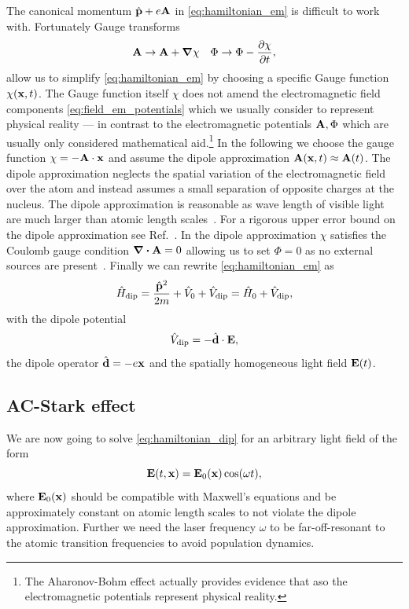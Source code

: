 The canonical momentum $\hat{\vb{p}}+e\vb{A}$ in \cref{eq:hamiltonian_em} is
difficult to work with. Fortunately Gauge transforms
\begin{align}
  \vb{A}\to\vb{A}+\grad{\chi}
  &&
  \Phi\to\Phi-\pdv{\chi}{t}
  \label{eq:gauge_transform_em},
\end{align}
allow us to simplify \cref{eq:hamiltonian_em} by choosing a specific Gauge
function $\chi(\vb{x},t)$. The Gauge function itself $\chi$ does not amend the
electromagnetic field components \cref{eq:field_em_potentials} which we
usually consider to represent physical reality --- in contrast to the
electromagnetic potentials $\vb{A},\Phi$ which are usually only considered
mathematical aid.\footnote{The Aharonov-Bohm effect actually provides evidence
that aso the electromagnetic potentials represent physical reality.} In the
following we choose the gauge function $\chi=-\vb{A}\cdot\vb{x}$ and assume
the dipole approximation $\vb{A}(\vb{x},t)\approx\vb{A}(t)$. The dipole
approximation neglects the spatial variation of the electromagnetic field
over the atom and instead assumes a small separation of opposite charges at
the nucleus. The dipole approximation is reasonable as wave length of visible
light are much larger than atomic length scales~\cite{Gerry2004}. For a
rigorous upper error bound on the dipole approximation see
Ref.~\cite{Bossmann2016}. In the dipole approximation $\chi$ satisfies the
Coulomb gauge condition $\divergence{\vb{A}}=0$ allowing us to set $\Phi=0$
as no external sources are present~\cite{Jackson2005}. Finally we can rewrite
\cref{eq:hamiltonian_em} as
\begin{equation}
  \hat{H}_\text{dip}
  =\frac{\hat{\vb{p}}^2}{2m}+\hat{V}_0+\hat{V}_\text{dip}
  =\hat{H}_0+\hat{V}_\text{dip}
  \label{eq:hamiltonian_dip},
\end{equation}
with the dipole potential
\begin{equation}
  \hat{V}_\text{dip}
  =-\hat{\vb{d}}\cdot\vb{E}
  \label{eq:potential_dip},
\end{equation}
the dipole operator $\hat{\vb{d}}=-e\vb{x}$ and the spatially homogeneous
light field $\vb{E}(t)$.

\subsection{AC-Stark effect}

We are now going to solve \cref{eq:hamiltonian_dip} for an arbitrary light
field of the form
\begin{equation}
  \vb{E}(t,\vb{x})
  =\vb{E}_0(\vb{x})\cos(\omega t)
  \label{eq:light_field},
\end{equation}
where $\vb{E}_0(\vb{x})$ should be compatible with Maxwell's equations and
be approximately constant on atomic length scales to not violate the dipole
approximation. Further we need the laser frequency $\omega$ to be
far-off-resonant to the atomic transition frequencies to avoid population
dynamics.

